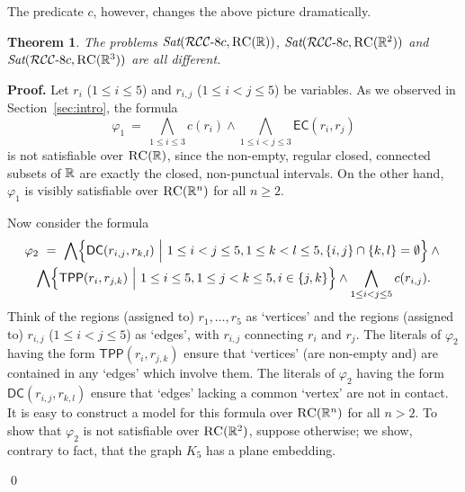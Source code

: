 \documentclass{LMCS}
\renewenvironment{proof}{\par\noindent\textbf{Proof.}}{\mbox{}\qed\par\medskip}
\theoremstyle{plain}
\newtheorem{theorem}[thm]{Theorem}
\newcommand{\Sat}{\textit{Sat}}
\begin{document}
The predicate $c$, however, changes the above picture dramatically.
\begin{theorem}
The problems $\Sat(\RCCEc, \RegC(\R))$, $\Sat(\RCCEc, \RegC(\R^2))$ and \linebreak
$\Sat(\RCCEc, \RegC(\R^3))$ are all different.
\label{obs:rccInsensitive}
\end{theorem}
\begin{proof}
Let $r_{i}$ ($1 \leq i \leq 5$) and $r_{i,j}$ ($1 \leq i < j \leq 5$)
be variables.  As we observed in Section~\ref{sec:intro}, the formula
\begin{equation*}
\varphi_1 ~=~
\bigwedge_{1 \leq i \leq 3} c(r_i) \wedge
\bigwedge_{1 \leq i < j \leq 3} \mathsf{EC}(r_i,r_j)
\end{equation*}
is not satisfiable over $\textsc{RC}(\mathbb{R})$, since the non-empty, regular
closed, connected subsets of $\mathbb{R}$ are exactly the closed, non-punctual
intervals. On the other hand, $\varphi_1$ is visibly satisfiable over
$\textsc{RC}(\mathbb{R}^n)$ for all $n \geq 2$.

\bigskip

\noindent
Now consider the formula
\begin{multline*}
\varphi_2 ~=~ \bigwedge \Bigl\{\mathsf{DC}(r_{i,j},r_{k,l}) \ \Big| \
1 \leq i < j \leq 5, 1 \leq k < l \leq 5, \{i,j\} \cap \{k,l\} = \emptyset \Bigr\} \wedge{}\\
\bigwedge \Bigl\{\mathsf{TPP}(r_i,r_{j,k}) \ \Big| \
1 \leq i \leq 5, 1 \leq j < k \leq 5, i \in \{j,k\} \Bigr\} \wedge
\bigwedge_{1 \leq i < j \leq 5} c(r_{i,j}).
\end{multline*}
Think of the regions (assigned to) $r_1, \ldots, r_5$ as `vertices'
and the regions (assigned to) $r_{i,j}$ ($1 \leq i < j \leq 5$) as
`edges', with $r_{i,j}$ connecting $r_i$ and $r_j$. The literals of
$\varphi_2$ having the form $\mathsf{TPP}(r_{i},r_{j,k})$ ensure that
`vertices' (are non-empty and) are contained in any `edges' which
involve them. The literals of $\varphi_2$ having the form
$\mathsf{DC}(r_{i,j},r_{k,l})$ ensure that `edges' lacking a common
`vertex' are not in contact. It is easy to construct a model for this
formula over $\textsc{RC}(\mathbb{R}^n)$ for all $n > 2$. To show that $\varphi_2$
is not satisfiable over $\textsc{RC}(\mathbb{R}^2)$, suppose otherwise; we show,
contrary to fact, that the graph $K_5$ has a plane embedding.


\end{proof}
\end{document}
